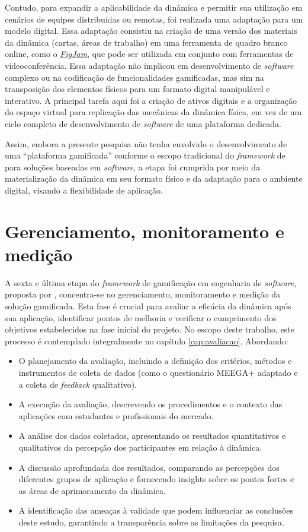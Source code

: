 \documentclass[
	12pt,
	openright,
	twoside,
	a4paper,
	english,
	brazil
	]{abntex2}
\begin{document}
Contudo, para expandir a aplicabilidade da dinâmica e permitir sua utilização em cenários de equipes distribuídas ou remotas, foi realizada uma adaptação para um modelo digital. Essa adaptação consistiu na criação de uma versão dos materiais da dinâmica (cartas, áreas de trabalho) em uma ferramenta de quadro branco online, como o \href{https://www.figma.com/pt-br/figjam/}{\textit{FigJam}}, que pode ser utilizada em conjunto com ferramentas de videoconferência. Essa adaptação não implicou em desenvolvimento de \textit{software} complexo ou na codificação de funcionalidades gamificadas, mas sim na transposição dos elementos físicos para um formato digital manipulável e interativo. A principal tarefa aqui foi a criação de ativos digitais e a organização do espaço virtual para replicação das mecânicas da dinâmica física, em vez de um ciclo completo de desenvolvimento de \textit{software} de uma plataforma dedicada.

Assim, embora a presente pesquisa não tenha envolvido o desenvolvimento de uma “plataforma gamificada” conforme o escopo tradicional do \textit{framework} de  para soluções baseadas em \textit{software}, a etapa foi cumprida por meio da materialização da dinâmica em seu formato físico e da adaptação para o ambiente digital, visando a flexibilidade de aplicação.

\section{Gerenciamento, monitoramento e medição}
\label{sec:gerenciamento-monitoramento-medicao}

A sexta e última etapa do \textit{framework} de gamificação em engenharia de \textit{software}, proposta por , concentra-se no gerenciamento, monitoramento e medição da solução gamificada. Esta fase é crucial para avaliar a eficácia da dinâmica após sua aplicação, identificar pontos de melhoria e verificar o cumprimento dos objetivos estabelecidos na fase inicial do projeto. No escopo deste trabalho, este processo é contemplado integralmente no capítulo \ref{cap:avaliacao}. Abordando:
\begin{itemize}
\item O planejamento da avaliação, incluindo a definição dos critérios, métodos e instrumentos de coleta de dados (como o questionário MEEGA+ adaptado e a coleta de \textit{feedback} qualitativo). 
\item A execução da avaliação, descrevendo os procedimentos e o contexto das aplicações com estudantes e profissionais do mercado. 
\item A análise dos dados coletados, apresentando os resultados quantitativos e qualitativos da percepção dos participantes em relação à dinâmica. 
\item A discussão aprofundada dos resultados, comparando as percepções dos diferentes grupos de aplicação e fornecendo insights sobre os pontos fortes e as áreas de aprimoramento da dinâmica. 
\item A identificação das ameaças à validade que podem influenciar as conclusões deste estudo, garantindo a transparência sobre as limitações da pesquisa. 
\end{itemize}
\end{document}

